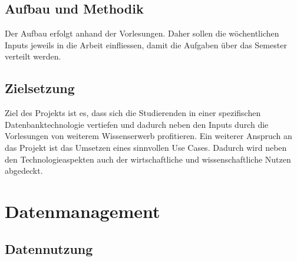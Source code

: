 \documentclass[12pt,titlepage]{article}
\begin{document}
\subsection{Aufbau und Methodik}
Der Aufbau erfolgt anhand der Vorlesungen. Daher sollen die wöchentlichen Inputs jeweils in die Arbeit einfliessen, damit die Aufgaben über das Semester verteilt werden. 

\subsection{Zielsetzung}
Ziel des Projekts ist es, dass sich die Studierenden in einer spezifischen Datenbanktechnologie vertiefen und dadurch neben den Inputs durch die Vorlesungen von weiterem Wissenserwerb profitieren. Ein weiterer Anspruch an das Projekt ist das Umsetzen eines sinnvollen Use Cases. Dadurch wird neben den Technologieaspekten auch der wirtschaftliche und wissenschaftliche Nutzen abgedeckt.
\newpage



\section{Datenmanagement}
\subsection{Datennutzung}
\end{document}
